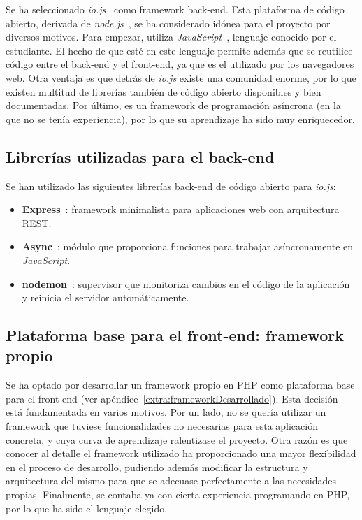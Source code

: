 Se ha seleccionado \textit{io.js}~\cite{iojs} como \gls{framework} \gls{back-end}.
Esta plataforma de código abierto, derivada de \textit{node.js}~\cite{nodejs}, se ha considerado idónea para el proyecto por diversos motivos.
Para empezar, utiliza \textit{JavaScript}~\cite{javascript}, lenguaje conocido por el estudiante.
El hecho de que esté en este lenguaje permite además que se reutilice código entre el \gls{back-end} y el \gls{front-end}, ya que es el utilizado por los navegadores web.
Otra ventaja es que detrás de \textit{io.js} existe una comunidad enorme, por lo que existen multitud de librerías también de código abierto disponibles y bien documentadas.
Por último, es un \gls{framework} de programación asíncrona (en la que no se tenía experiencia), por lo que su aprendizaje ha sido muy enriquecedor.

\subsection*{Librerías utilizadas para el \gls{back-end}\label{ssec:dp:back-end-libs}}

Se han utilizado las siguientes librerías \gls{back-end} de código abierto para \textit{io.js}:

\begin{itemize}
  \item \textbf{Express}~\cite{express}: \gls{framework} minimalista para aplicaciones web con arquitectura \gls{REST}.

  \item \textbf{Async}~\cite{async}: módulo que proporciona funciones para trabajar asíncronamente en \textit{JavaScript}.

  \item \textbf{nodemon}~\cite{nodemon}: supervisor que monitoriza cambios en el código de la aplicación y reinicia el servidor automáticamente.

\end{itemize}

\subsection*{Plataforma base para el \gls{front-end}: \gls{framework} propio\label{ssec:dp:front-end}}

Se ha optado por desarrollar un \gls{framework} propio en \gls{PHP} como plataforma base para el \gls{front-end} (ver apéndice~\ref{extra:frameworkDesarrollado}).
Esta decisión está fundamentada en varios motivos.
Por un lado, no se quería utilizar un \gls{framework} que tuviese funcionalidades no necesarias para esta aplicación concreta, y cuya curva de aprendizaje ralentizase el proyecto.
Otra razón es que conocer al detalle el \gls{framework} utilizado ha proporcionado una mayor flexibilidad en el proceso de desarrollo, pudiendo además modificar la estructura y arquitectura del mismo para que se adecuase perfectamente a las necesidades propias.
Finalmente, se contaba ya con cierta experiencia programando en \gls{PHP}, por lo que ha sido el lenguaje elegido.

